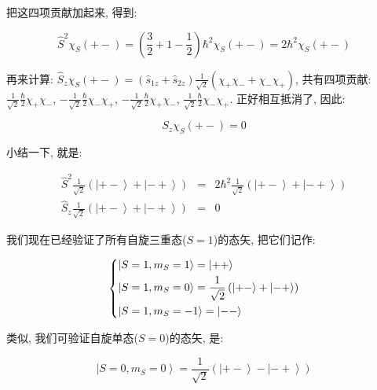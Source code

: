 把这四项贡献加起来, 得到:

\begin{equation*}
\hat S^2 \chi_S(+-) = \left( \frac{3}{2} + 1 -
\frac{1}{2}\right)\hbar^2 \chi_S(+-) = 2\hbar^2\chi_S(+-)
\end{equation*}

再来计算: $\hat S_z \chi_S(+-) = \left(\hat s_{1z} + \hat
s_{2z}\right) \frac{1}{\sqrt 2}\left( \chi_+ \chi_- + \chi_- \chi_+
\right)$, 共有四项贡献: $\frac{1}{\sqrt 2} \frac{\hbar}{2}
\chi_+\chi_-$, $- \frac{1}{\sqrt 2} \frac{\hbar}{2} \chi_-\chi_+$,
$- \frac{1}{\sqrt 2} \frac{\hbar}{2} \chi_+\chi_-$, $\frac{1}{\sqrt
2} \frac{\hbar}{2} \chi_-\chi_+$. 正好相互抵消了, 因此:

\begin{equation*}
S_z \chi_S(+-) = 0
\end{equation*}

小结一下, 就是:

\begin{eqnarray*}
 \hat S^2 \frac{1}{\sqrt 2}\left( \left| {+-} \right\rangle + \left| {-+} \right\rangle \right) &=& 2 \hbar^2 \frac{1}{\sqrt 2}\left( \left| {+-} \right\rangle + \left| {-+} \right\rangle \right) \\
 \hat S_z \frac{1}{\sqrt 2}\left( \left| {+-} \right\rangle + \left| {-+} \right\rangle \right) &=& 0
\end{eqnarray*}

我们现在已经验证了所有自旋三重态($S=1$)的态矢, 把它们记作:

\begin{equation}\label{spin triplet state kets}
\left\{ \begin{gathered}
  \left| {S=1, m_S=1} \right\rangle = \left| {++} \right\rangle \hfill \\
  \left| {S=1, m_S=0} \right\rangle = \frac{1}{\sqrt 2}\left( \left| {+-} \right\rangle + \left| {-+} \right\rangle \right) \hfill \\
  \left| {S=1, m_S=-1} \right\rangle = \left| {--} \right\rangle \hfill \\
\end{gathered}  \right.
\end{equation}

类似, 我们可验证自旋单态($S=0$)的态矢, 是:


\begin{equation}\label{spin singlet state ket}
\left| {S=0, m_S=0} \right\rangle = \frac{1}{\sqrt 2}\left( \left|
{+-} \right\rangle - \left| {-+} \right\rangle \right)
\end{equation}

